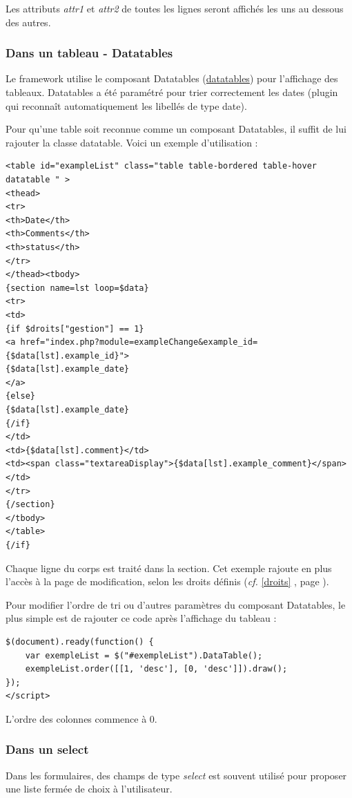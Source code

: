 Les attributs \textit{attr1} et \textit{attr2} de toutes les lignes seront affichés les uns au dessous des autres.

\subsubsection{Dans un tableau - Datatables}

Le framework utilise le composant Datatables (\url{datatables}) pour l'affichage des tableaux. Datatables a été paramétré pour trier correctement les dates (plugin qui reconnaît automatiquement les libellés de type date).

Pour qu'une table soit reconnue comme un composant Datatables, il suffit de lui rajouter la classe datatable. Voici un exemple d'utilisation :
\begin{lstlisting}
<table id="exampleList" class="table table-bordered table-hover datatable " >
<thead>
<tr>
<th>Date</th>
<th>Comments</th>
<th>status</th>
</tr>
</thead><tbody>
{section name=lst loop=$data}
<tr>
<td>
{if $droits["gestion"] == 1}
<a href="index.php?module=exampleChange&example_id={$data[lst].example_id}">
{$data[lst].example_date}
</a>
{else}
{$data[lst].example_date}
{/if}
</td>
<td>{$data[lst].comment}</td>
<td><span class="textareaDisplay">{$data[lst].example_comment}</span></td>
</tr>
{/section}
</tbody>
</table>
{/if}
\end{lstlisting}

Chaque ligne du corps est traité dans la section. Cet exemple rajoute en plus l'accès à la page de modification, selon les droits définis (\textit{cf.} \ref{droits} \textit{}, page \pageref{droits}).

Pour modifier l'ordre de tri ou d'autres paramètres du composant Datatables, le plus simple est de rajouter ce code après l'affichage du tableau :

\begin{lstlisting}
$(document).ready(function() {
	var exempleList = $("#exempleList").DataTable();
	exempleList.order([[1, 'desc'], [0, 'desc']]).draw();
});
</script>
\end{lstlisting}

L'ordre des colonnes commence à 0.

\subsubsection{Dans un select}

Dans les formulaires, des champs de type \textit{select} est souvent utilisé pour proposer une liste fermée de choix à l'utilisateur. 

